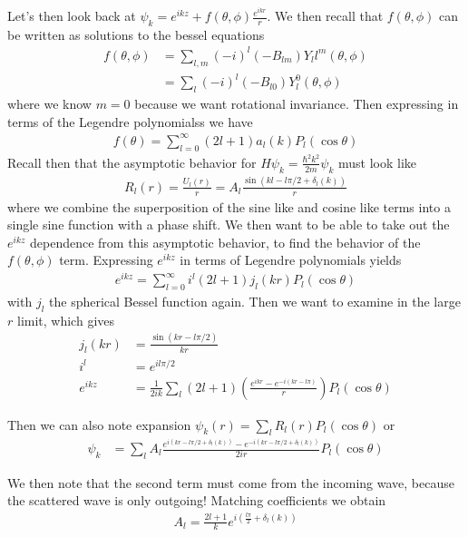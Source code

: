 \documentclass[10pt]{report}
\begin{document}
Let's then look back at $\psi_k = e^{ikz} + f(\theta,\phi)\frac{e^{ikr}}{r}$. We then recall that $f(\theta,\phi)$ can be written as solutions to the bessel equations
\begin{align}
    f(\theta,\phi) &= \sum_{l,m} (-i)^l(-B_{lm})Y_ll^m(\theta,\phi)\\
    &= \sum_l (-i)^l (-B_{l0})Y_l^0(\theta,\phi)
\end{align}
where we know $m=0$ because we want rotational invariance. Then expressing in terms of the Legendre polynomialss we have
\begin{align}
    f(\theta) = \sum_{l=0}^{\infty}(2l+1)a_l(k)P_l(\cos\theta)
\end{align}
Recall then that the asymptotic behavior for $H\psi_k = \frac{\hbar^2 k^2}{2m}\psi_k$ must look like
\begin{align}
    R_l(r) =\frac{U_l(r)}{r}= A_l\frac{\sin(kl - l\pi/2 + \delta_l(k))}{r}
\end{align}
where we combine the superposition of the sine like and cosine like terms into a single sine function with a phase shift. We then want to be able to take out the $e^{ikz}$ dependence from this asymptotic behavior, to find the behavior of the $f(\theta,\phi)$ term. Expressing $e^{ikz}$ in terms of Legendre polynomials yields
\begin{align}
    e^{ikz} = \sum_{l=0}^{\infty}i^l(2l+1)j_l(kr)P_l(\cos\theta)
\end{align}
with $j_l$ the spherical Bessel function again. Then we want to examine in the large $r$ limit, which gives
\begin{align}
    j_l(kr) &= \frac{\sin(kr - l\pi/2)}{kr}\\
    i^l &= e^{il\pi/2}\\
    e^{ikz} &= \frac{1}{2ik}\sum_l(2l+1)\left( \frac{e^{ikr} - e^{-i(kr - l\pi)}}{r} \right)P_l(\cos\theta)
\end{align}

Then we can also note expansion $\psi_k(r) = \sum_l R_l(r)P_l(\cos\theta)$ or
\begin{align}
    \psi_k &= \sum_l A_l\frac{e^{i(kr-l\pi/2 + \delta_l(k))} - e^{-i(kr - l\pi/2 + \delta_l(k))}}{2ir} P_l(\cos\theta)
\end{align}

We then note that the second term must come from the incoming wave, because the scattered wave is only outgoing! Matching coefficients we obtain
\begin{align}
    A_l = \frac{2l+1}{k}e^{i\left( \frac{l\pi}{2} + \delta_l(k) \right)}
\end{align}
\end{document}

